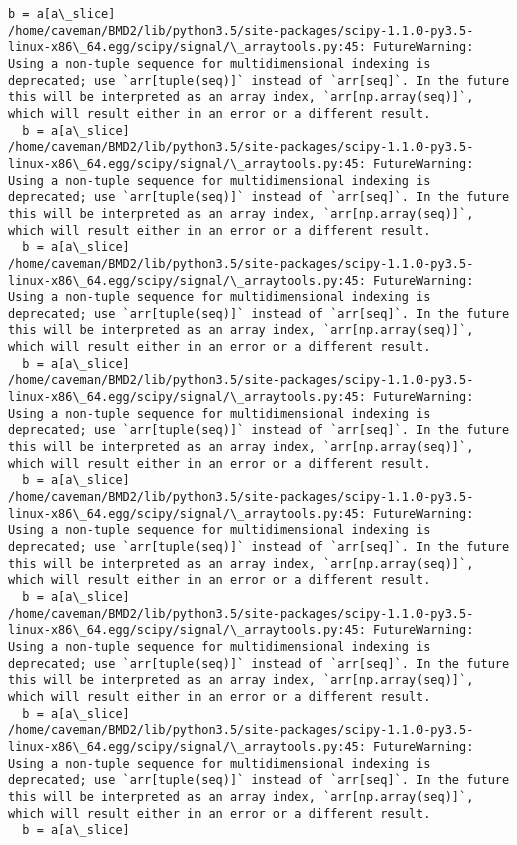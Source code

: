 \documentclass[11pt]{article}
\begin{document}
\begin{Verbatim}[commandchars=\\\{\}]
  b = a[a\_slice]
/home/caveman/BMD2/lib/python3.5/site-packages/scipy-1.1.0-py3.5-linux-x86\_64.egg/scipy/signal/\_arraytools.py:45: FutureWarning: Using a non-tuple sequence for multidimensional indexing is deprecated; use `arr[tuple(seq)]` instead of `arr[seq]`. In the future this will be interpreted as an array index, `arr[np.array(seq)]`, which will result either in an error or a different result.
  b = a[a\_slice]
/home/caveman/BMD2/lib/python3.5/site-packages/scipy-1.1.0-py3.5-linux-x86\_64.egg/scipy/signal/\_arraytools.py:45: FutureWarning: Using a non-tuple sequence for multidimensional indexing is deprecated; use `arr[tuple(seq)]` instead of `arr[seq]`. In the future this will be interpreted as an array index, `arr[np.array(seq)]`, which will result either in an error or a different result.
  b = a[a\_slice]
/home/caveman/BMD2/lib/python3.5/site-packages/scipy-1.1.0-py3.5-linux-x86\_64.egg/scipy/signal/\_arraytools.py:45: FutureWarning: Using a non-tuple sequence for multidimensional indexing is deprecated; use `arr[tuple(seq)]` instead of `arr[seq]`. In the future this will be interpreted as an array index, `arr[np.array(seq)]`, which will result either in an error or a different result.
  b = a[a\_slice]
/home/caveman/BMD2/lib/python3.5/site-packages/scipy-1.1.0-py3.5-linux-x86\_64.egg/scipy/signal/\_arraytools.py:45: FutureWarning: Using a non-tuple sequence for multidimensional indexing is deprecated; use `arr[tuple(seq)]` instead of `arr[seq]`. In the future this will be interpreted as an array index, `arr[np.array(seq)]`, which will result either in an error or a different result.
  b = a[a\_slice]
/home/caveman/BMD2/lib/python3.5/site-packages/scipy-1.1.0-py3.5-linux-x86\_64.egg/scipy/signal/\_arraytools.py:45: FutureWarning: Using a non-tuple sequence for multidimensional indexing is deprecated; use `arr[tuple(seq)]` instead of `arr[seq]`. In the future this will be interpreted as an array index, `arr[np.array(seq)]`, which will result either in an error or a different result.
  b = a[a\_slice]
/home/caveman/BMD2/lib/python3.5/site-packages/scipy-1.1.0-py3.5-linux-x86\_64.egg/scipy/signal/\_arraytools.py:45: FutureWarning: Using a non-tuple sequence for multidimensional indexing is deprecated; use `arr[tuple(seq)]` instead of `arr[seq]`. In the future this will be interpreted as an array index, `arr[np.array(seq)]`, which will result either in an error or a different result.
  b = a[a\_slice]
/home/caveman/BMD2/lib/python3.5/site-packages/scipy-1.1.0-py3.5-linux-x86\_64.egg/scipy/signal/\_arraytools.py:45: FutureWarning: Using a non-tuple sequence for multidimensional indexing is deprecated; use `arr[tuple(seq)]` instead of `arr[seq]`. In the future this will be interpreted as an array index, `arr[np.array(seq)]`, which will result either in an error or a different result.
  b = a[a\_slice]

    \end{Verbatim}

    \begin{center}
    \end{center}
    { \hspace*{\fill} \\}
    

    
    
    
    
\end{document}
